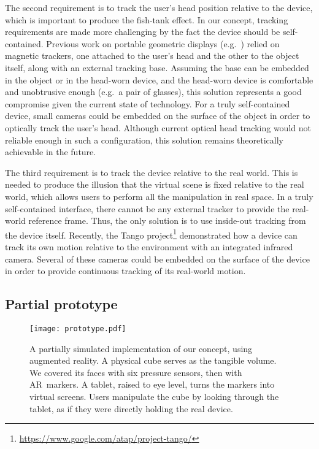 \documentclass{vgtc}                         \havecopyrightspacefalse
\begin{document}
The second requirement is to track the user's head position relative to the device, which is important to produce the fish-tank effect. In our concept, tracking requirements are made more challenging by the fact the device should be self-contained. Previous work on portable geometric displays (e.g.~\cite{stavness10}) relied on magnetic trackers, one attached to the user's head and the other to the object itself, along with an external tracking base. Assuming the base can be embedded in the object or in the head-worn device, and the head-worn device is comfortable and unobtrusive enough (e.g.~a pair of glasses), this solution represents a good compromise given the current state of technology. For a truly self-contained device, small cameras could be embedded on the surface of the object in order to optically track the user's head. Although current optical head tracking would not reliable enough in such a configuration, this solution remains theoretically achievable in the future.

The third requirement is to track the device relative to the real world. This is needed to produce the illusion that the virtual scene is fixed relative to the real world, which allows users to perform all the manipulation in real space. In a truly self-contained interface, there cannot be any external tracker to provide the real-world reference frame. Thus, the only solution is to use inside-out tracking from the device itself. Recently, the Tango project\footnote{\url{https://www.google.com/atap/project-tango/}} demonstrated how a device can track its own motion relative to the environment with an integrated infrared camera. Several of these cameras could be embedded on the surface of the device in order to provide continuous tracking of its real-world motion.

\subsection{Partial prototype}

\begin{figure}[t]
  \centering
  \texttt{[image: prototype.pdf]}
  \caption{A partially simulated implementation of our concept, using augmented reality. A physical cube serves as the tangible volume. We covered its faces with six pressure sensors, then with AR~markers. A tablet, raised to eye level, turns the markers into virtual screens. Users manipulate the cube by looking through the tablet, as if they were directly holding the real device.}
  \label{fig:proto}
\end{figure}
\end{document}
